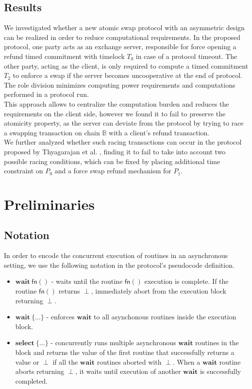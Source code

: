 \documentclass{article}      	%
\begin{document}
\subsection{Results}

We investigated whether a new atomic swap protocol with an asymmetric design can be realized in order to reduce computational requirements. In the proposed protocol, one party acts as an exchange server, responsible for force opening a refund timed commitment with timelock $T_0$ in case of a protocol timeout. The other party, acting as the client, is only required to compute a timed commitment $T_2$ to enforce a swap if the server becomes uncooperative at the end of protocol. The role division minimizes computing power requirements and computations performed in a protocol run. \\
This approach allows to centralize the computation burden and reduces the requirements on the client side, however we found it to fail to preserve the atomicity property, as the server can deviate from the protocol by trying to race a swapping transaction on chain $\mathbb{B}$ with a client's refund transaction. \\
We further analyzed whether such racing transactions can occur in the protocol proposed by Thyagarajan et al. \cite{uas}, finding it to fail to take into account two possible racing conditions, which can be fixed by placing additional time constraint on $P_0$ and a force swap refund mechanism for $P_1$.

\section{Preliminaries}

\subsection{Notation}

In order to encode the concurrent execution of routines in an asynchronous setting, we use the following notation in the protocol's pseudocode definition.
\begin{itemize}[nosep, noitemsep]
    \item $\mathbf{wait} \: \mathsf{fn}()$ - waits until the routine $\mathsf{fn}()$ execution is complete. If the routine $\mathsf{fn}()$ returns $\perp$, immediately abort from the execution block returning $\perp$. \\
    \item $\mathbf{wait} \: \{...\}$ - enforces $\mathbf{wait}$ to all asynchonous routines inside the execution block. \\
    \item $\mathbf{select} \: \{...\}$ - concurrently runs multiple asynchronous $\mathbf{wait}$ routines in the block and returns the value of the first routine that successfully returns a value or $\perp$ if all the $\mathbf{wait}$ routines aborted with $\perp$. When a $\mathbf{wait}$ routine aborts returning $\perp$, it waits until execution of another $\mathbf{wait}$ is successfully completed. \\
\end{itemize}
\end{document}

